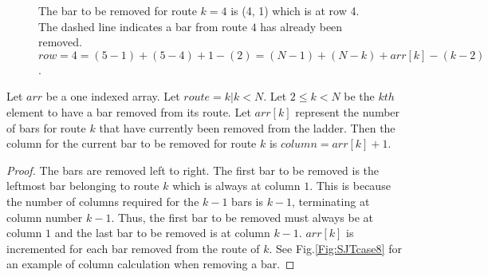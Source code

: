 \begin{figure}[!htp]
  \begin{center}
  \end{center}
  \caption{The bar to be removed for route $k=4$ is (4, 1) which is at row 4. The dashed line indicates a bar 
  from route $4$ has already been removed. $row= 4 = (5-1)+(5-4)+ 1 - (2) = (N-1)+(N-k) + arr[k] - (k-2)$.}

  \label{fig:SJTcase7}
\end{figure}

\begin{lemma}
   Let $arr$ be a one indexed array. Let $route=k | k < N$. Let $2 \leq k < N$ be the $kth$ element to have a bar removed from its route. 
  Let $arr[k]$ represent the number of bars for route $k$ that have currently been removed from the ladder. 
  Then the column for the current bar to be removed for route $k$ is $column=arr[k]+1$.
\end{lemma}
\begin{proof}
  The bars are removed left to right. The first bar to be removed is the leftmost bar belonging to route $k$ which 
  is always at column $1$. This is because the number of columns required for the $k-1$ bars is $k-1$, terminating at 
  column number $k-1$. Thus, the first bar to be removed must always be at column $1$ and the last bar to 
  be removed is at column $k-1$. $arr[k]$ is incremented for each bar removed from the route of $k$. See Fig.\ref{Fig:SJTcase8}
  for an example of column calculation when removing a bar.
\end{proof}

